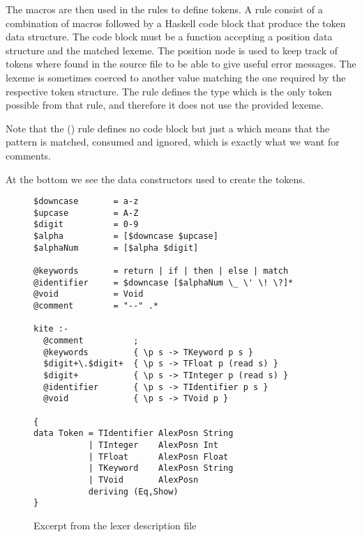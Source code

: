 The macros are then used in the rules to define tokens. A rule consist of a combination of macros followed by a Haskell code block that produce the token data structure. The code block must be a function accepting a position data structure and the matched lexeme. The position node is used to keep track of tokens where found in the source file to be able to give useful error messages. The lexeme is sometimes coerced to another value matching the one required by the respective token structure. The  rule defines the  type which is the only token possible from that rule, and therefore it does not use the provided lexeme.

Note that the () rule defines no code block but just a \code{;} which means that the pattern is matched, consumed and ignored, which is exactly what we want for comments.

At the bottom we see the data constructors used to create the tokens.

\begin{figure}[p]
\begin{lstlisting}
$downcase		= a-z
$upcase			= A-Z
$digit			= 0-9
$alpha			= [$downcase $upcase]
$alphaNum		= [$alpha $digit]

@keywords		= return | if | then | else | match
@identifier		= $downcase [$alphaNum \_ \' \! \?]*
@void           = Void
@comment		= "--" .*

kite :-
  @comment		    ;
  @keywords		    { \p s -> TKeyword p s }
  $digit+\.$digit+	{ \p s -> TFloat p (read s) }
  $digit+		    { \p s -> TInteger p (read s) }
  @identifier		{ \p s -> TIdentifier p s }
  @void		        { \p s -> TVoid p }

{
data Token = TIdentifier AlexPosn String
           | TInteger    AlexPosn Int
           | TFloat      AlexPosn Float
           | TKeyword    AlexPosn String
           | TVoid       AlexPosn
           deriving (Eq,Show)
}
\end{lstlisting}
\label{fig:lexer}
\caption{Excerpt from the lexer description file}
\end{figure}

